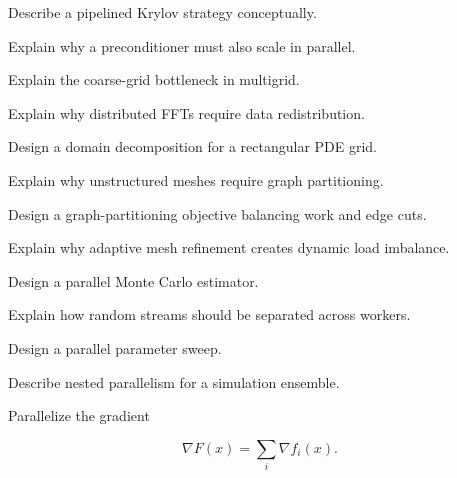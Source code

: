 \begin{exercise}[3]
Describe a pipelined Krylov strategy conceptually.
\end{exercise}

\begin{exercise}[3]
Explain why a preconditioner must also scale in parallel.
\end{exercise}

\begin{exercise}[3]
Explain the coarse-grid bottleneck in multigrid.
\end{exercise}

\begin{exercise}[3]
Explain why distributed FFTs require data redistribution.
\end{exercise}

\begin{exercise}[3]
Design a domain decomposition for a rectangular PDE grid.
\end{exercise}

\begin{exercise}[3]
Explain why unstructured meshes require graph partitioning.
\end{exercise}

\begin{exercise}[3]
Design a graph-partitioning objective balancing work and edge cuts.
\end{exercise}

\begin{exercise}[3]
Explain why adaptive mesh refinement creates dynamic load imbalance.
\end{exercise}

\begin{exercise}[2]
Design a parallel Monte Carlo estimator.
\end{exercise}

\begin{exercise}[3]
Explain how random streams should be separated across workers.
\end{exercise}

\begin{exercise}[3]
Design a parallel parameter sweep.
\end{exercise}

\begin{exercise}[3]
Describe nested parallelism for a simulation ensemble.
\end{exercise}

\begin{exercise}[3]
Parallelize the gradient

\[
\nabla F(x)
=
\sum_i
\nabla f_i(x).
\]
\end{exercise}

